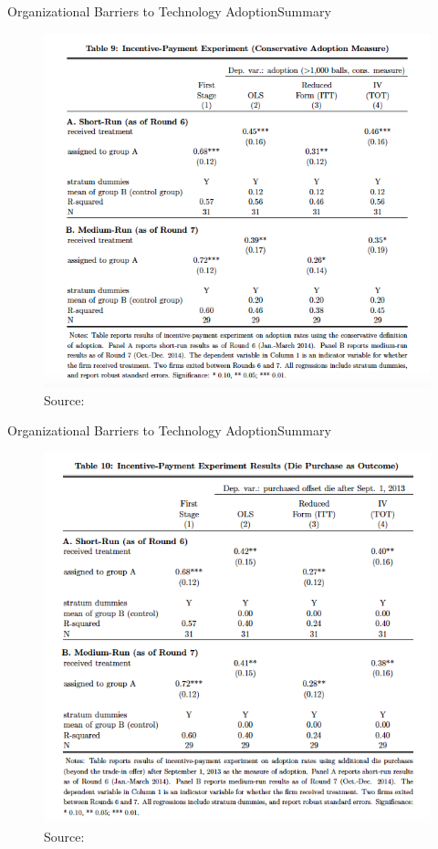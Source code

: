 \documentclass{beamer}
\begin{document}
\begin{frame}{Organizational Barriers to Technology Adoption}{Summary}
\begin{figure}[h]
\begin{centering}
  \includegraphics[width=\textwidth]{atkin5}
  \caption{Source: \cite{Atkin2015}}
   \label{fig:atkin5}
\end{centering}
\end{figure}
\end{frame}

\begin{frame}{Organizational Barriers to Technology Adoption}{Summary}
\begin{figure}[h]
\begin{centering}
  \includegraphics[width=\textwidth]{atkin6}
  \caption{Source: \cite{Atkin2015}}
   \label{fig:atkin6}
\end{centering}
\end{figure}
\end{frame}
\end{document}
